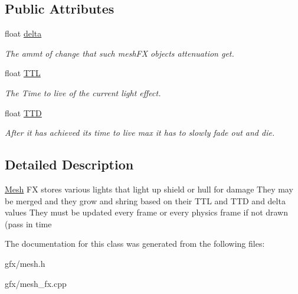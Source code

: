 \subsection*{Public Attributes}
\begin{DoxyCompactItemize}
\item 
float \hyperlink{classMeshFX_ac1d051b39f8f4a3ae09484c75bf69a3c}{delta}\hypertarget{classMeshFX_ac1d051b39f8f4a3ae09484c75bf69a3c}{}\label{classMeshFX_ac1d051b39f8f4a3ae09484c75bf69a3c}

\begin{DoxyCompactList}\small\item\em The ammt of change that such mesh\+FX objects attenuation get. \end{DoxyCompactList}\item 
float \hyperlink{classMeshFX_a9b23656f04e276cc9cb03018d2238f78}{T\+TL}\hypertarget{classMeshFX_a9b23656f04e276cc9cb03018d2238f78}{}\label{classMeshFX_a9b23656f04e276cc9cb03018d2238f78}

\begin{DoxyCompactList}\small\item\em The Time to live of the current light effect. \end{DoxyCompactList}\item 
float \hyperlink{classMeshFX_af38dc6cf5d395f501f28000da1f122e5}{T\+TD}\hypertarget{classMeshFX_af38dc6cf5d395f501f28000da1f122e5}{}\label{classMeshFX_af38dc6cf5d395f501f28000da1f122e5}

\begin{DoxyCompactList}\small\item\em After it has achieved its time to live max it has to slowly fade out and die. \end{DoxyCompactList}\end{DoxyCompactItemize}


\subsection{Detailed Description}
\hyperlink{classMesh}{Mesh} FX stores various lights that light up shield or hull for damage They may be merged and they grow and shring based on their T\+TL and T\+TD and delta values They must be updated every frame or every physics frame if not drawn (pass in time 

The documentation for this class was generated from the following files\+:\begin{DoxyCompactItemize}
\item 
gfx/mesh.\+h\item 
gfx/mesh\+\_\+fx.\+cpp\end{DoxyCompactItemize}

